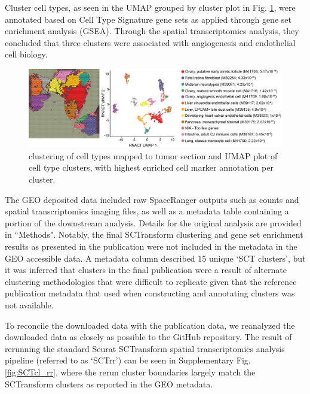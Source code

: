 \documentclass{article}
\begin{document}
Cluster cell types, as seen in the UMAP grouped by cluster plot in Fig. \ref{fig:Sanders_tissuefig}, were annotated based on Cell Type Signature gene sets as applied through gene set enrichment analysis (GSEA). Through the spatial transcriptomics analysis, they concluded that three clusters were associated with angiogenesis and endothelial cell biology.

\begin{figure}[h!]
    \centering
    \includegraphics[width=\textwidth]{images/Sanders_Fig3B.png}
    \caption{\citet{sanders_small_2022} clustering of cell types mapped to tumor section and UMAP plot of cell type clusters, with highest enriched cell marker annotation per cluster.}
    \label{fig:Sanders_tissuefig}
\end{figure}

The GEO deposited data included raw SpaceRanger outputs such as counts and spatial transcriptomics imaging files, as well as a metadata table containing a portion of the downstream analysis. Details for the original \citet{sanders_small_2022} analysis are provided in ``Methods". Notably, the final SCTransform clustering and gene set enrichment results as presented in the publication were not included in the metadata in the GEO accessible data. A metadata column described 15 unique `SCT clusters', but it was inferred that clusters in the final publication were a result of alternate clustering methodologies that were difficult to replicate given that the reference publication metadata that \citet{sanders_small_2022} used when constructing and annotating clusters was not available.

To reconcile the downloaded data with the publication data, we reanalyzed the downloaded data as closely as possible to the \citet{sanders_small_2022} GitHub repository. The result of rerunning the standard Seurat SCTransform spatial transcriptomics analysis pipeline (referred to as `SCTrr') can be seen in Supplementary Fig. \ref{fig:SCTcl_rr}, where the rerun cluster boundaries largely match the SCTransform clusters as reported in the GEO metadata.
\end{document}

